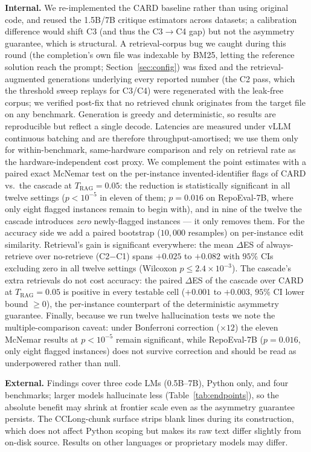\documentclass[10pt,conference]{IEEEtran}
\newcommand{\ugr}[1]{{\color{revgreen}#1}}
\newcommand{\sugg}[1]{{\color{suggviolet}#1}}
\begin{document}
\textbf{Internal.} We re-implemented the CARD baseline rather than using original
code, and reused the 1.5B/7B critique estimators across datasets; a calibration
difference would shift C3 (and thus the C3$\rightarrow$C4 gap) but not the asymmetry
guarantee, which is structural. \ugr{A retrieval-corpus bug we caught during
this round (the completion's own file was indexable by BM25, letting the
reference solution reach the prompt; Section~\ref{sec:config}) was fixed and
the retrieval-augmented generations underlying every reported number (the C2
pass, which the threshold sweep replays for C3/C4) were regenerated with the
leak-free corpus; we verified post-fix that no
retrieved chunk originates from the target file on any benchmark.} Generation is greedy and deterministic, so results
are reproducible but reflect a single decode. Latencies are measured under vLLM
continuous batching and are therefore throughput-amortised; we use them only for
within-benchmark, same-hardware comparison and rely on retrieval rate as the
hardware-independent cost proxy. \sugg{We complement the point estimates with a
paired exact McNemar test on the per-instance invented-identifier flags of CARD
vs.\ the cascade at $T_{\text{RAG}}=0.05$: the reduction is statistically
significant in all twelve settings ($p<10^{-5}$ in eleven of them; $p=0.016$ on
RepoEval-7B, where only eight flagged instances remain to begin with), and in
nine of the twelve the cascade introduces \emph{zero} newly-flagged instances
--- it only removes them. For the accuracy side we add a paired bootstrap
($10{,}000$ resamples) on per-instance edit similarity. Retrieval's gain is
significant everywhere: the mean $\Delta$ES of always-retrieve over no-retrieve
(C2$-$C1) spans $+0.025$ to $+0.082$ with $95\%$ CIs excluding zero in all twelve
settings (Wilcoxon $p\le2.4\times10^{-3}$). The cascade's extra retrievals do not
cost accuracy: the paired $\Delta$ES of the cascade over CARD at
$T_{\text{RAG}}=0.05$ is positive in every testable cell ($+0.001$ to $+0.003$,
$95\%$ CI lower bound $\ge0$), the per-instance counterpart of the deterministic
asymmetry guarantee. Finally, because we run twelve hallucination tests we note
the multiple-comparison caveat: under Bonferroni correction ($\times12$) the
eleven McNemar results at $p<10^{-5}$ remain significant, while RepoEval-7B
($p=0.016$, only eight flagged instances) does not survive correction and should
be read as underpowered rather than null.}

\textbf{External.} Findings cover three code LMs (0.5B--7B), Python only, and four
benchmarks; larger models hallucinate less (Table~\ref{tab:endpoints}), so the
absolute benefit may shrink at frontier scale even as the asymmetry guarantee
persists. The CCLong-chunk surface strips blank lines during its construction,
which does not affect Python scoping but makes its raw text differ slightly from
on-disk source. Results on other languages or proprietary models may differ.
\end{document}
